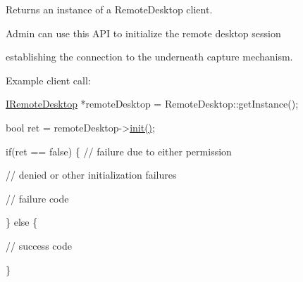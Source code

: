 \-Returns an instance of a \-Remote\-Desktop client. 

\-Admin can use this \-A\-P\-I to initialize the remote desktop session

establishing the connection to the underneath capture mechanism.

\-Example client call\-:


\begin{DoxyPre}\end{DoxyPre}



\begin{DoxyPre}  \hyperlink{classknoxremotedesktop_1_1IRemoteDesktop}{IRemoteDesktop} *remoteDesktop = RemoteDesktop::getInstance();\end{DoxyPre}



\begin{DoxyPre}  bool ret = remoteDesktop->\hyperlink{classknoxremotedesktop_1_1IRemoteDesktop_a7bed40d98c61713a69cf1dad8b37beae}{init()};\end{DoxyPre}



\begin{DoxyPre}  if(ret == false)  \{ // failure due to either permission\end{DoxyPre}



\begin{DoxyPre}                      // denied or other initialization failures\end{DoxyPre}



\begin{DoxyPre}     // failure code\end{DoxyPre}



\begin{DoxyPre}  \} else \{\end{DoxyPre}



\begin{DoxyPre}     // success code\end{DoxyPre}



\begin{DoxyPre}  \}\end{DoxyPre}



\begin{DoxyPre} \end{DoxyPre}


